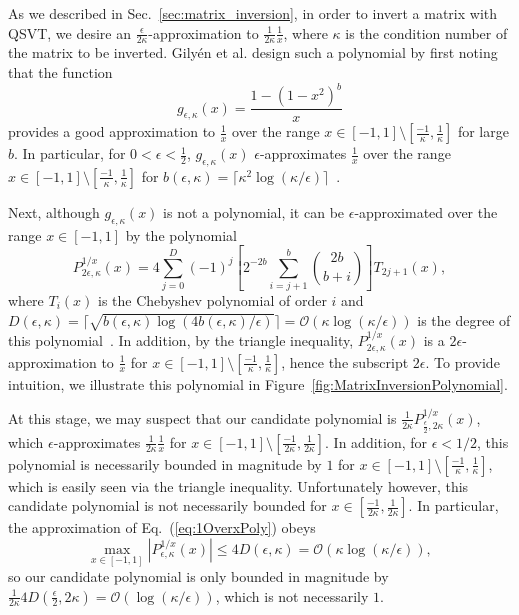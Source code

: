 \documentclass[aps,pra,showpacs,notitlepage,twocolumn,superscriptaddress,nofootinbib]{revtex4-1}
\begin{document}
As we described in Sec.~\ref{sec:matrix_inversion}, in order to invert a matrix with QSVT, we desire an $\frac{\epsilon}{2 \kappa}$-approximation to $\frac{1}{2 \kappa} \frac{1}{x}$, where $\kappa$ is the condition number of the matrix to be inverted. Gily\'en et al. design such a polynomial by first noting that the function
    \begin{equation}
        g_{\epsilon, \kappa}(x) = \frac{1-(1-x^2)^b}{x}
    \end{equation}
provides a good approximation to $\frac{1}{x}$ over the range $x \in [-1, 1] \setminus [\frac{-1}{\kappa}, \frac{1}{\kappa}]$ for large $b$. In particular, for $0< \epsilon < \frac{1}{2}$, $g_{\epsilon,\kappa}(x)$ $\epsilon$-approximates $\frac{1}{x}$ over the range $x \in [-1, 1] \setminus [\frac{-1}{\kappa}, \frac{1}{\kappa}]$ for $b(\epsilon,\kappa) = \lceil \kappa^2 \log(\kappa/\epsilon) \rceil$~\cite{Gily_n_2019, Childs_2017}.

Next, although $g_{\epsilon, \kappa}(x)$ is not a polynomial, it can be $\epsilon$-approximated over the range $x \in [-1, 1] $ by the polynomial
    \begin{equation}\label{eq:1OverxPoly}
        P^{1/x}_{2\epsilon, \kappa}(x) = 4\sum_{j=0}^D (-1)^j \left[2^{-2b} \sum_{i=j+1}^b {2b \choose b+i}\right] T_{2j+1}(x),
    \end{equation}
where $T_i(x)$ is the Chebyshev polynomial of order $i$ and $D(\epsilon,\kappa) = \Big\lceil \sqrt{b(\epsilon,\kappa) \log(4b(\epsilon,\kappa)/\epsilon)} \Big\rceil = \mathcal{O}(\kappa \log(\kappa/\epsilon))$ is the degree of this polynomial~\cite{Gily_n_2019}. In addition, by the triangle inequality, $P^{1/x}_{2\epsilon, \kappa}(x)$ is a $2\epsilon$-approximation to $\frac{1}{x}$ for $x \in [-1, 1] \setminus [\frac{-1}{\kappa}, \frac{1}{\kappa}]$, hence the subscript $2\epsilon$. To provide intuition, we illustrate this polynomial in Figure~\ref{fig:MatrixInversionPolynomial}.

At this stage, we may suspect that our candidate polynomial is $\frac{1}{2 \kappa} P^{1/x}_{\frac{\epsilon}{2}, 2 \kappa}(x)$, which $\epsilon$-approximates $\frac{1}{2 \kappa} \frac{1}{x}$ for $x \in [-1,1] \setminus [\frac{-1}{2\kappa}, \frac{1}{2\kappa}]$. In addition, for $\epsilon < 1/2$, this polynomial is necessarily bounded in magnitude by $1$ for $x \in [-1,1] \setminus [\frac{-1}{\kappa}, \frac{1}{\kappa}]$, which is easily seen via the triangle inequality. Unfortunately however, this candidate polynomial is not necessarily bounded for $x \in [\frac{-1}{2 \kappa}, \frac{1}{2 \kappa}]$. In particular, the approximation of Eq.~(\ref{eq:1OverxPoly}) obeys~\cite{Childs_2017, Gily_n_2019}
\begin{equation}
    \max_{x\in[-1,1]} |P^{1/x}_{\epsilon, \kappa}(x)| \leq 4D(\epsilon,\kappa) = \mathcal{O}(\kappa \log(\kappa/\epsilon)),
\end{equation}
so our candidate polynomial is only bounded in magnitude by $\frac{1}{2\kappa} 4 D(\frac{\epsilon}{2}, 2\kappa) = \mathcal{O}(\log(\kappa/ \epsilon))$, which is not necessarily $1$. 
\end{document}
